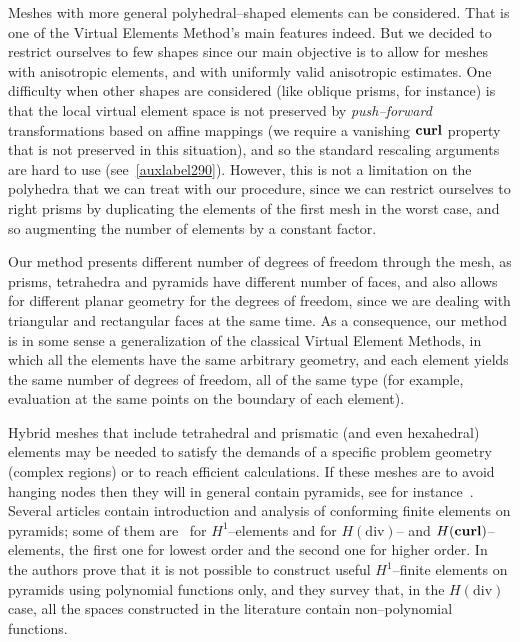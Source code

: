 Meshes with more general polyhedral--shaped elements can be considered. 
That is one of the Virtual Elements Method's main features indeed. 
But we decided to restrict
ourselves to few 
shapes since our main objective is to allow for meshes with anisotropic elements, 
and with uniformly valid anisotropic 
estimates. 
One 
difficulty when other shapes are considered (like
oblique prisms, for instance) is that the local virtual element space is not 
preserved by 
\emph{push--forward} transformations based on affine mappings
(we require a vanishing ${\bf curl}$ property that is not preserved in this 
situation), and so the standard rescaling arguments are hard to use 
(see~\ref{auxlabel290}). However, this is not a limitation on the polyhedra
that we can treat with our procedure, since we can restrict ourselves
to right prisms by duplicating the elements of the first mesh in the worst case,
and so augmenting the number of elements by a constant factor.

Our method presents different number of degrees of freedom through the 
mesh, as prisms, tetrahedra and pyramids have different number of faces, and also 
allows for different planar geometry for the degrees of freedom, since we are 
dealing
with triangular and rectangular faces at the same time. As a consequence, our 
method is in some sense a generalization of the classical Virtual Element Methods,
in which all the elements have the same arbitrary geometry, and each element yields
the same number of degrees of freedom, all of the same type (for example, 
evaluation at the same points on the boundary of each element).

Hybrid meshes that include tetrahedral and prismatic (and even hexahedral) 
elements may be needed to satisfy the demands of a specific problem geometry 
(complex regions) or to reach efficient calculations. If these meshes are 
to avoid hanging nodes then they will in general contain pyramids, see 
for instance~\cite{owenSaigal}. Several articles contain introduction and analysis
of conforming finite elements on pyramids; some of them are~\cite{bergot} 
for $H^1$--elements and 
\cite{gh99, Nigam-2012} for $H(\mbox{div})$-- and $H({\bf curl})$--elements, 
the first one for 
lowest order and the second one for higher order. 
In~\cite{Nigam-2012} the authors prove that it is not possible to construct 
useful $H^1$--finite 
elements on pyramids using  polynomial functions only, and they
survey that, in the $H(\mbox{div})$ 
case, all the spaces 
constructed in the literature contain non--polynomial functions.

